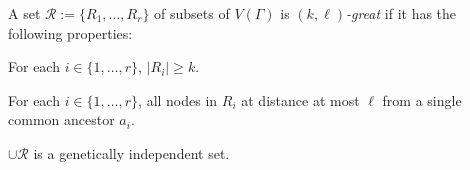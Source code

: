 \documentclass{patmorin}
\newcommand{\defin}[1]{\emph{\color{brightmaroon}#1}}
\begin{document}



A set $\mathcal{R}:=\{R_1,\ldots,R_r\}$ of subsets of $V(\Gamma)$ is \defin{$(k,\ell)$-great} if it has the following properties:

\begin{compactenum}
  \item For each $i\in\{1,\ldots,r\}$, $|R_i|\ge k$.
  \item For each $i\in\{1,\ldots,r\}$, all nodes in $R_i$ at distance at most $\ell$ from a single common ancestor $a_i$.
  \item $\cup\mathcal{R}$ is a genetically independent set.
\end{compactenum}
\end{document}
